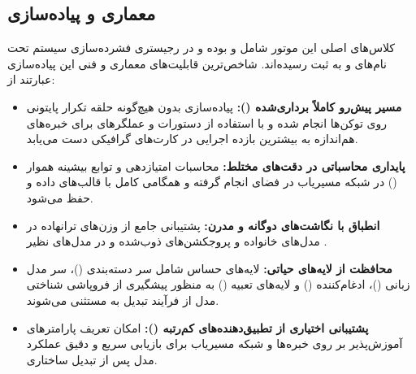 \subsection{معماری و پیاده‌سازی}
کلاس‌های اصلی این موتور شامل  و  بوده و در رجیستری فشرده‌سازی سیستم تحت نام‌های  و  به ثبت رسیده‌اند. شاخص‌ترین قابلیت‌های معماری و فنی این پیاده‌سازی عبارتند از:
\begin{itemize}
    \item \textbf{مسیر پیش‌رو کاملاً برداری‌شده ():} پیاده‌سازی بدون هیچ‌گونه حلقه تکرار پایتونی روی توکن‌ها انجام شده و با استفاده از دستورات  و عملگرهای  برای خبره‌های هم‌اندازه به بیشترین بازده اجرایی در کارت‌های گرافیکی دست می‌یابد.
    \item \textbf{پایداری محاسباتی در دقت‌های مختلط:} محاسبات امتیازدهی و توابع بیشینه هموار () در شبکه مسیریاب در فضای  انجام گرفته و همگامی کامل با قالب‌های داده  و  حفظ می‌شود.
    \item \textbf{انطباق با نگاشت‌های دوگانه و مدرن:} پشتیبانی جامع از وزن‌های ترانهاده  در مدل‌های خانواده  و پروجکشن‌های ذوب‌شده و  در مدل‌های نظیر .
    \item \textbf{محافظت از لایه‌های حیاتی:} لایه‌های حساس شامل سر دسته‌بندی ()، سر مدل زبانی ()، ادغام‌کننده () و لایه‌های تعبیه () به منظور پیشگیری از فروپاشی شناختی مدل از فرآیند تبدیل به  مستثنی می‌شوند.
    \item \textbf{پشتیبانی اختیاری از تطبیق‌دهنده‌های کم‌رتبه ():} امکان تعریف پارامترهای آموزش‌پذیر  بر روی خبره‌ها و شبکه مسیریاب برای بازیابی سریع و دقیق عملکرد مدل پس از تبدیل ساختاری.
\end{itemize}
